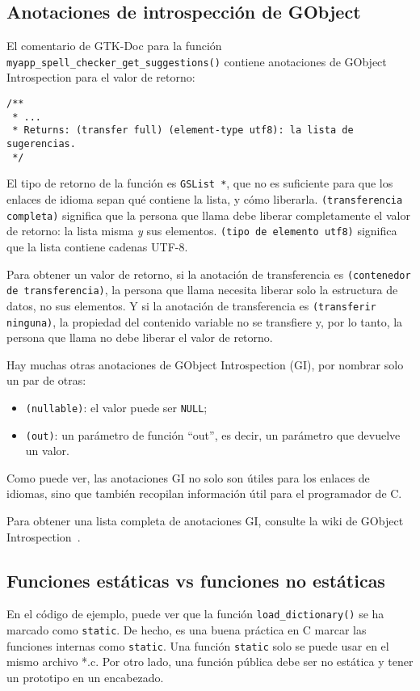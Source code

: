 \subsection{Anotaciones de introspección de GObject}
El comentario de GTK-Doc para la función \lstinline{myapp_spell_checker_get_suggestions()} contiene anotaciones de GObject Introspection para el valor de retorno:

\begin{lstlisting}[style=GLib/GTK]
/**
 * ...
 * Returns: (transfer full) (element-type utf8): la lista de sugerencias.
 */
\end{lstlisting}

El tipo de retorno de la función es \lstinline{GSList *}, que no es suficiente para que los enlaces de idioma sepan qué contiene la lista, y cómo liberarla. \texttt{(transferencia completa)} significa que la persona que llama debe liberar completamente el valor de retorno: la lista misma \emph{y} sus elementos. \texttt{(tipo de elemento utf8)} significa que la lista contiene cadenas UTF-8.

Para obtener un valor de retorno, si la anotación de transferencia es \texttt{(contenedor de transferencia)}, la persona que llama necesita liberar solo la estructura de datos, no sus elementos. Y si la anotación de transferencia es \texttt{(transferir ninguna)}, la propiedad del contenido variable no se transfiere y, por lo tanto, la persona que llama no debe liberar el valor de retorno.

Hay muchas otras anotaciones de GObject Introspection (GI), por nombrar solo un par de otras:
\begin{itemize}
    \item \texttt{(nullable)}: el valor puede ser \lstinline{NULL};
    \item \texttt{(out)}: un parámetro de función ``out'', es decir, un parámetro que devuelve un valor.
\end{itemize}

Como puede ver, las anotaciones GI no solo son útiles para los enlaces de idiomas, sino que también recopilan información útil para el programador de C.

Para obtener una lista completa de anotaciones GI, consulte la wiki de GObject Introspection~\cite{gobject-introspection}.

\subsection{Funciones estáticas vs funciones no estáticas}
En el código de ejemplo, puede ver que la función \lstinline{load_dictionary()} se ha marcado como \lstinline{static}. De hecho, es una buena práctica en C marcar las funciones internas como \lstinline{static}. Una función \lstinline{static} solo se puede usar en el mismo archivo *.c. Por otro lado, una función pública debe ser no estática y tener un prototipo en un encabezado.

